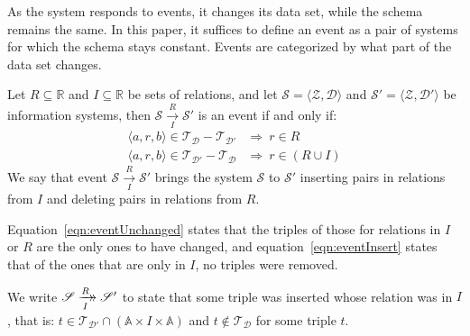 \documentclass[runningheads]{llncs}
\newcommand{\xrightarrowdbl}[2][]{%
  \xrightarrow[#1]{#2}\mathrel{\mkern-14mu}\rightarrow
}
\newcommand{\pair}[2]{\langle{#1},{#2}\rangle}
\newcommand{\triple}[3]{\langle{#1},{#2},{#3}\rangle}
\newcommand{\Atoms}{\mathbb{A}}
\newcommand{\Rels}{\mathbb{R}}   %
\newcommand{\triples}{\mathcal{T}}
\newcommand{\Triple}[3]{#1\times#2\times#3}
\newcommand{\dataset}{\mathscr{D}}
\newcommand{\schema}{\mathscr{Z}}
\newcommand{\infsys}{\mathscr{S}}
\begin{document}
   As the system responds to events, it changes its data set, while the schema remains the same.
   In this paper, it suffices to define an event as a pair of systems for which the schema stays constant.
   Events are categorized by what part of the data set changes.
   
\begin{definition}[Event]
   Let $R \subseteq \Rels$ and $I \subseteq \Rels$ be sets of relations,
   and let $\infsys=\pair{\schema}{\dataset}$ and  $\infsys'=\pair{\schema}{\dataset'}$ be information systems,
   then $\infsys\xrightarrow[I]{R} \infsys'$ is an event if and only if:
   \begin{align}
      \triple{a}{r}{b}\in\triples_{\dataset}-\triples_{\dataset'}&\Rightarrow\ r\in R
   \label{eqn:eventUnchanged}\\
      \triple{a}{r}{b}\in\triples_{\dataset'}-\triples_{\dataset}&\Rightarrow\ r\in(R \cup I)
   \label{eqn:eventInsert}
   \end{align}
   We say that event $\infsys\xrightarrow[I]{R} \infsys'$ brings the system $\infsys$ to $\infsys'$ inserting pairs in relations from $I$ and deleting pairs in relations from $R$.
\end{definition}
   
   Equation~\ref{eqn:eventUnchanged} states that the triples of those for relations in $I$ or $R$ are the only ones to have changed, and equation~\ref{eqn:eventInsert} states that of the ones that are only in $I$, no triples were removed.
   
\begin{definition}
   We write $\infsys \xrightarrowdbl[I]{R} \infsys'$ to state that some triple was inserted whose relation was in $I$, that is:
   $t \in \triples_{\dataset'} \cap (\Triple{\Atoms}{I}{\Atoms})$ and $t \not\in \triples_{\dataset}$ for some triple $t$.
\end{definition}
   
\end{document}
